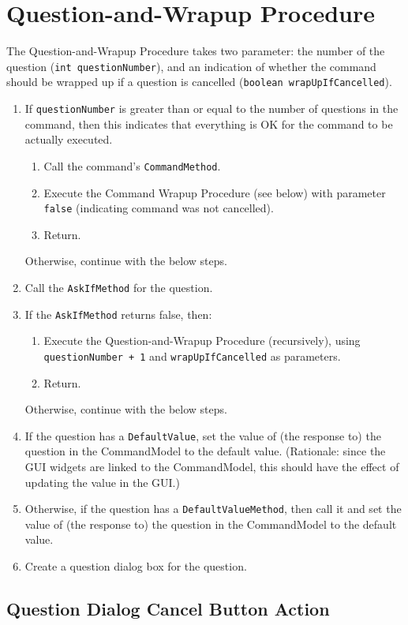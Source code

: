 \documentclass[11pt]{article}
\begin{document}
\section{Question-and-Wrapup Procedure}

The Question-and-Wrapup Procedure takes two parameter: the number of the
question ({\tt int questionNumber}), and an indication of whether the
command should be wrapped up if a question is cancelled
({\tt boolean wrapUpIfCancelled}).

\begin{enumerate}
\item If {\tt questionNumber} is greater than or equal to the number
  of questions in the command, then this indicates that everything
  is OK for the command to be actually executed.
  \begin{enumerate}
  \item Call the command's {\tt CommandMethod}.
  \item Execute the Command Wrapup Procedure (see below) with parameter
    {\tt false} (indicating command was not cancelled).
  \item Return.
  \end{enumerate}
  Otherwise, continue with the below steps.
\item Call the {\tt AskIfMethod} for the question.
\item If the {\tt AskIfMethod} returns false, then:
  \begin{enumerate}
  \item Execute the Question-and-Wrapup Procedure
    (recursively), using {\tt questionNumber + 1} and {\tt wrapUpIfCancelled}
    as parameters.
  \item Return.
  \end{enumerate}
  Otherwise, continue with the below steps.
\item If the question  has a {\tt DefaultValue}, set the value of
  (the response to) the question in the CommandModel to the default value.
  (Rationale:  since the GUI widgets are linked to the CommandModel,
  this should have the effect of updating the value in the GUI.)
\item Otherwise, if the question has a {\tt DefaultValueMethod}, then call it
  and set the value of (the response to) the question in the CommandModel to
  the default value.
\item Create a question dialog box for the question.
\end{enumerate}

\subsection{Question Dialog Cancel Button Action}
\end{document}
